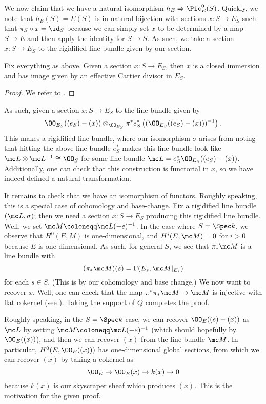 \documentclass[../notes.tex]{subfiles}
\begin{document}
We now claim that we have a natural isomorphism $h_E\Rightarrow\Pic^0_E(S)$. Quickly, we note that $h_E(S)=E(S)$ is in natural bijection with sections $x\colon S\to E_S$ such that $\pi_S\circ x=\id_S$ because we can simply set $x$ to be determined by a map $S\to E$ and then apply the identity for $S\to S$. As such, we take a section $x\colon S\to E_S$ to the rigidified line bundle given by our section.
\begin{lemma}
	Fix everything as above. Given a section $x\colon S\to E_S$, then $x$ is a closed immersion and has image given by an effective Cartier divisor in $E_S$.
\end{lemma}
\begin{proof}
	We refer to \cite[062Y]{stacks}.
\end{proof}
As such, given a section $x\colon S\to E_S$ to the line bundle given by
\[\OO_{E_S}((e_S)-(x))\otimes_{\OO_{E_S}}\pi^*e_S^*\left((\OO_{E_S}((e_S)-(x)))^{-1}\right).\]
This makes a rigidified line bundle, where our isomorphism $\sigma$ arises from noting that hitting the above line bundle $e_S^*$ makes this line bundle look like $\mc L\otimes\mc L^{-1}\cong\OO_S$ for some line bundle $\mc L=e_S^*\OO_{E_S}((e_S)-(x))$. Additionally, one can check that this construction is functorial in $x$, so we have indeed defined a natural transformation.

It remains to check that we have an isomorphism of functors. Roughly speaking, this is a special case of cohomology and base-change. Fix a rigidified line bundle $(\mc L,\sigma)$; then we need a section $x\colon S\to E_S$ producing this rigidified line bundle. Well, we set $\mc M\coloneqq\mc L(-e)^{-1}$. In the case where $S=\Spec k$, we observe that $H^0(E,M)$ is one-dimensional, and $H^i(E,\mc M)=0$ for $i>0$ because $E$ is one-dimensional. As such, for general $S$, we see that $\pi_*\mc M$ is a line bundle with
\[(\pi_*\mc M)(s)=\Gamma(E_s,\mc M|_{E_s})\]
for each $s\in S$. (This is by our cohomology and base change.) We now want to recover $x$. Well, one can check that the map $\pi^*\pi_*\mc M\to\mc M$ is injective with flat cokernel (see \cite[00MF]{stacks}). Taking the support of $Q$ completes the proof.
\begin{remark}
	Roughly speaking, in the $S=\Spec k$ case, we can recover $\OO_E((e)-(x))$ as $\mc L$ by setting $\mc M\coloneqq\mc L(-e)^{-1}$ (which should hopefully by $\OO_E((x))$), and then we can recover $(x)$ from the line bundle $\mc M$. In particular, $H^0(E,\OO_E((x)))$ has one-dimensional global sections, from which we can recover $(x)$ by taking a cokernel as
	\[\OO_E\to\OO_E(x)\to k(x)\to0\]
	because $k(x)$ is our skyscraper sheaf which produces $(x)$. This is the motivation for the given proof.
\end{remark}
\end{document}
